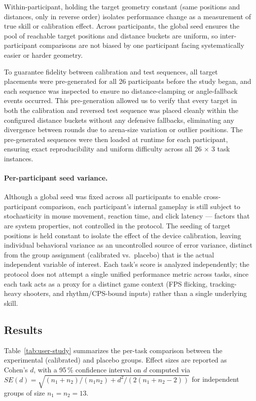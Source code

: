 Within-participant, holding the target geometry constant (same positions and distances,
only in reverse order) isolates performance change as a measurement of true skill or
calibration effect. Across participants, the global seed ensures the pool of reachable
target positions and distance buckets are uniform, so inter-participant comparisons
are not biased by one participant facing systematically easier or harder geometry.

To guarantee fidelity between calibration and test sequences, all target placements
were pre-generated for all 26 participants before the study began, and each sequence
was inspected to ensure no distance-clamping or angle-fallback events occurred. This
pre-generation allowed us to verify that every target in both the calibration and
reversed test sequence was placed cleanly within the configured distance buckets
without any defensive fallbacks, eliminating any divergence between rounds due to
arena-size variation or outlier positions. The pre-generated sequences were then
loaded at runtime for each participant, ensuring exact reproducibility and uniform
difficulty across all 26 × 3 task instances.

\paragraph{Per-participant seed variance.}
Although a global seed was fixed across all participants to enable cross-participant
comparison, each participant's internal gameplay is still subject to stochasticity in
mouse movement, reaction time, and click latency — factors that are system properties,
not controlled in the protocol. The seeding of target positions is held constant
to isolate the effect of the device calibration, leaving individual behavioral
variance as an uncontrolled source of error variance, distinct from the group
assignment (calibrated vs.\ placebo) that is the actual independent variable of
interest. Each task's score is analyzed independently; the protocol does not
attempt a single unified performance metric across tasks, since each task acts
as a proxy for a distinct game context (FPS flicking, tracking-heavy shooters,
and rhythm/CPS-bound inputs) rather than a single underlying skill.

\subsection{Results}
Table~\ref{tab:user-study} summarizes the per-task comparison between the
experimental (calibrated) and placebo groups. Effect sizes are reported as
Cohen's $d$, with a 95\,\% confidence interval on $d$ computed via
$SE(d) = \sqrt{(n_1+n_2)/(n_1 n_2) + d^2/(2(n_1+n_2-2))}$ for independent
groups of size $n_1=n_2=13$.

